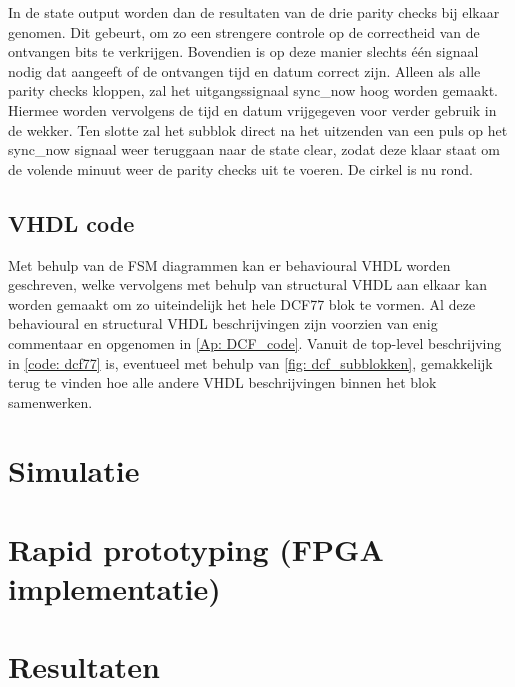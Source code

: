 \noindent In de state output worden dan de resultaten van de drie parity checks bij elkaar genomen. Dit gebeurt, om zo een strengere controle op de correctheid van de ontvangen bits te verkrijgen. Bovendien is op deze manier slechts \'e\'en signaal nodig dat aangeeft of de ontvangen tijd en datum correct zijn. Alleen als alle parity checks kloppen, zal het uitgangssignaal sync\_now hoog worden gemaakt. Hiermee worden vervolgens de tijd en datum vrijgegeven voor verder gebruik in de wekker. Ten slotte zal het subblok direct na het uitzenden van een puls op het sync\_now signaal weer teruggaan naar de state clear, zodat deze klaar staat om de volende minuut weer de parity checks uit te voeren. De cirkel is nu rond.

\subsection{VHDL code}
Met behulp van de FSM diagrammen kan er behavioural VHDL worden geschreven, welke vervolgens met behulp van structural VHDL aan elkaar kan worden gemaakt om zo uiteindelijk het hele DCF77 blok te vormen. Al deze behavioural en structural VHDL beschrijvingen zijn voorzien van enig commentaar en opgenomen in \cref{Ap: DCF_code}. Vanuit de top-level beschrijving in \cref{code: dcf77} is, eventueel met behulp van \cref{fig: dcf_subblokken}, gemakkelijk terug te vinden hoe alle andere VHDL beschrijvingen binnen het blok samenwerken.

\section{Simulatie}

\section{Rapid prototyping (FPGA implementatie)}

\section{Resultaten}
